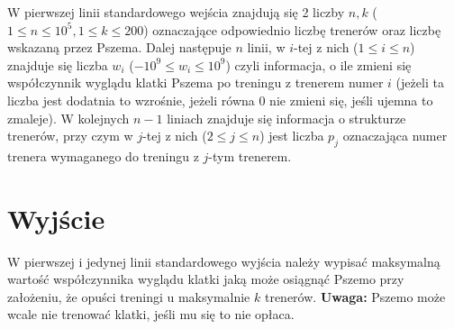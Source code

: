 \documentclass[zad,zawodnik,utf8]{sinol}
\begin{document}
\begin{tasktext}
W pierwszej linii standardowego wejścia znajdują się 2 liczby $n, k$ ($1 \leq n \leq 10^5, 1 \leq k \leq 200$) oznaczające odpowiednio liczbę trenerów oraz liczbę wskazaną przez Pszema. Dalej następuje $n$ linii, w $i$-tej z nich ($1 \leq i \leq n$) znajduje się liczba $w_i$ ($-10^9 \leq w_i \leq 10^9$) czyli informacja, o ile zmieni się współczynnik wyglądu klatki Pszema po treningu z trenerem numer $i$ (jeżeli ta liczba jest dodatnia to wzrośnie, jeżeli równa $0$ nie zmieni się, jeśli ujemna to zmaleje). W kolejnych $n - 1$ liniach znajduje się informacja o strukturze trenerów, przy czym w $j$-tej z nich ($2 \leq j \leq n$) jest liczba $p_j$ oznaczająca numer trenera wymaganego do treningu z $j$-tym trenerem.

	\section{Wyjście}
W pierwszej i jedynej linii standardowego wyjścia należy wypisać maksymalną wartość współczynnika wyglądu klatki jaką może osiągnąć Pszemo przy założeniu, że opuści treningi u maksymalnie $k$ trenerów.
	\makecompactexample
\textbf{Uwaga:} Pszemo może wcale nie trenować klatki, jeśli mu się to nie opłaca.
	\iffalse
	\section{Wyjaśnienie do przykładu}
	A rafał, to lubi jeść kupę.
	\fi
\end{tasktext}
\end{document}
